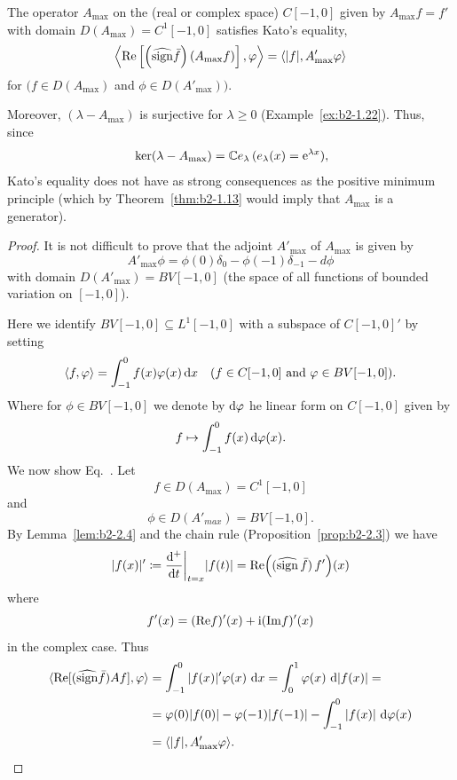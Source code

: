 \begin{example}\label{ex:b2-2.12}
The operator $A_{\max}$ on the (real or complex space) $C[-1,0]$ given by $A_{\max}f = f'$ with domain $D(A_{\max}) = C^{1}[-1,0]$ satisfies Kato's equality, \ie 
\begin{equation}\label{eq:b2-2.16}
\left\langle \Re\left[\left(\widehat{\sign} \bar{f}\right)(A_{\max}f)\right],\phi \right\rangle = \langle |f|,A'_{\max}\phi \rangle
\end{equation}
for $(f \in D(A_{\max})$ and $ \phi \in D(A'_{\max}))$.

Moreover, $(\lambda - A_{\max})$ is surjective for $\lambda \geq 0$ (\cf Example~\ref{ex:b2-1.22}).
Thus, since 
\[
	\mathop{}\mathrm{ker}(\lambda - A_{\max}) = \mathbb{C} e_{\lambda} \, (e_{\lambda}(x) = \mathrm{e}^{\lambda x}), 
\]
Kato's equality does not have as strong consequences as the positive minimum principle (which by Theorem~\ref{thm:b2-1.13} would imply that $A_{\max}$ is a generator).
\end{example}
\begin{proof}
It is not difficult to prove that the adjoint $A'_{\max}$ of\/ $A_{\max}$ is given by
\begin{equation}\label{eq:b2-2.17}
A'_{\max}\phi = \phi(0)\delta_{0} - \phi(-1)\delta_{-1} - d\phi
\end{equation}
with domain $D(A'_{\max}) = BV[-1,0]$ (the space of all functions of bounded variation on $[-1,0]$).

Here we identify $BV[-1,0] \subseteq L^{1}[-1,0]$ with a subspace of\/ $C[-1,0]'$ by setting 
%
\[
	\langle f,\phi \rangle = \int_{-1}^{0} f(x) \phi(x) \dx 
	\quad (f \in C[-1,0] \text{ and } \phi \in BV[-1,0]) .
\]
%
Where for $\phi \in BV[-1,0]$ we denote by $\diff{\phi}$ he linear form on $C[-1,0]$ given by 
%
\[
	f \mapsto \int_{-1}^{0} f(x)  \diff{\phi(x)} .
\]
%
We now show Eq.~.
Let 
%
\[
	f \in D(A_{\max}) = C^{1}[-1,0] 
\]
%
and 
%
\[
	\phi \in D(A'_{max}) =  BV[-1,0] .
\]
%
By Lemma~\ref{lem:b2-2.4} and the chain rule (Proposition~\ref{prop:b2-2.3}) we have
\[
|f(x)|' \coloneq \frac{\diff{^{+}}}{\dt}\bigg|_{t=x} |f(t)| 
= \Re \mleft( ( \widehat{\sign}\, \bar{f} ) \, f' \mright)(x)
\]
where
%
\[
	  f'(x) = (\mathop{}\!\mathrm{Re} f)'(x) + \mathrm{i} (\mathop{}\!\mathrm{Im} f)'(x)  
\]
%
in the complex case.
Thus
\begin{align*}
\langle \Re[(\widehat{\sign} \bar{f})Af],\phi \rangle &= \int_{-1}^{0} |f(x)|'\phi(x)\, \dx = \int_{0}^{1} \phi(x)\, \diff{|f(x)|} = \\
&= \phi(0)|f(0)| - \phi(-1)|f(-1)| - \int_{-1}^{0} |f(x)|\,\diff{\phi(x)}  \\
&= \langle |f|,A'_{\max}\phi \rangle.
\tag*{\qedsymbol}%
\end{align*}
\let\qedsymbol\relax
\end{proof}
